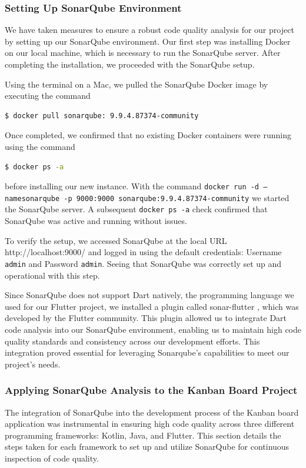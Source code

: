 \subsubsection{Setting Up SonarQube Environment}
We have taken measures to ensure a robust code quality analysis for our project by setting up our SonarQube environment. Our first step was installing Docker on our local machine, which is necessary to run the SonarQube server. After completing the installation, we proceeded with the SonarQube setup.
\par
Using the terminal on a Mac, we pulled the SonarQube Docker \cite{Docker} image by executing the command 
\begin{lstlisting}[language=bash]
    $ docker pull sonarqube: 9.9.4.87374-community 
  \end{lstlisting}
Once completed, we confirmed that no existing Docker containers were running using the command 
\begin{lstlisting}[language=bash]
    $ docker ps -a 
\end{lstlisting}
before installing our new instance. With the command \texttt{docker run -d — name\newline sonarqube -p 9000:9000 sonarqube:9.9.4.87374-community} we started the SonarQube server. A subsequent \texttt{docker ps -a} check confirmed that SonarQube was active and running without issues.
\par
To verify the setup, we accessed SonarQube at the local URL http://localhost:9000/ and logged in using the default credentials: Username \texttt{admin} and Password \texttt{admin}. Seeing that SonarQube was correctly set up and operational with this step.
\par
Since SonarQube does not support Dart natively, the programming language we used for our Flutter project, we installed a plugin called sonar-flutter \cite{flutter_sonar}, which was developed by the Flutter community. This plugin allowed us to integrate Dart code analysis into our SonarQube environment, enabling us to maintain high code quality standards and consistency across our development efforts. This integration proved essential for leveraging Sonarqube's capabilities to meet our project's needs.
\subsubsection{Applying SonarQube Analysis to the Kanban Board Project}
The integration of SonarQube into the development process of the Kanban board application was instrumental in ensuring high code quality across three different programming frameworks: Kotlin, Java, and Flutter. This section details the steps taken for each framework to set up and utilize SonarQube for continuous inspection of code quality.

